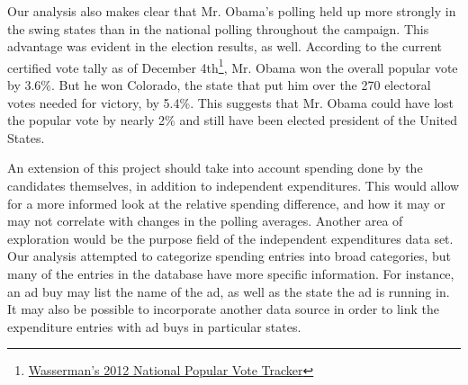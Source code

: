 \documentclass[11pt]{article}\usepackage{graphicx, color}
\begin{document}
Our analysis also makes clear that Mr. Obama's polling held up more strongly in the swing states than in the national polling throughout the campaign. This advantage was evident in the election results, as well. According to the current certified vote tally as of December 4th\footnote{\href{https://docs.google.com/spreadsheet/lv?key=0AjYj9mXElO_QdHpla01oWE1jOFZRbnhJZkZpVFNKeVE&toomany=true}{Wasserman's 2012 National Popular Vote Tracker}}, Mr. Obama won the overall popular vote by 3.6\%. But he won Colorado, the state that put him over the 270 electoral votes needed for victory, by 5.4\%. This suggests that Mr. Obama could have lost the popular vote by nearly 2\% and still have been elected president of the United States.

An extension of this project should take into account spending done by the candidates themselves, in addition to independent expenditures. This would allow for a more informed look at the relative spending difference, and how it may or may not correlate with changes in the polling averages. Another area of exploration would be the purpose field of the independent expenditures data set. Our analysis attempted to categorize spending entries into broad categories, but many of the entries in the database have more specific information. For instance, an ad buy may list the name of the ad, as well as the state the ad is running in. It may also be possible to incorporate another data source in order to link the expenditure entries with ad buys in particular states.
\end{document}
